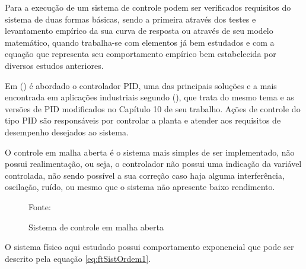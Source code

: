Para a execução de um sistema de controle podem ser verificados requisitos do sistema de duas formas básicas, 
sendo a primeira através dos testes e levantamento empírico da sua curva de resposta ou através de seu modelo matemático, 
quando trabalha-se com elementos já bem estudados e com a equação que representa seu comportamento empírico bem estabelecida por diversos estudos anteriores.


Em \citeauthor{dorf2011modern}(\citeyear{dorf2011modern}) 
é abordado o controlador PID, 
uma das principais soluções e a mais encontrada em aplicações industriais segundo \citeauthor{Ogata}(\citeyear{Ogata}), 
que trata do mesmo tema e as versões de PID modificados no Capítulo 10 de seu trabalho. 
Ações de controle do tipo PID são responsáveis por controlar a planta e atender aos requisitos de desempenho desejados ao sistema.





\newpage

O controle em malha aberta é o sistema mais simples de ser implementado, não possui realimentação, ou seja, o controlador não possui uma indicação da variável controlada, não sendo possível a sua correção caso haja alguma interferência, oscilação, ruído, ou mesmo que o sistema não apresente baixo rendimento.

\begin{figure}[!htb]
\centering
\caption{ Sistema de controle em malha aberta}
\label{fig:AcaoMalhaAberta}

{\small Fonte: \cite{Ogata}}
\end{figure}

O sistema físico aqui estudado possui comportamento exponencial que pode ser descrito pela equação \ref{eq:ftSistOrdem1}. 





